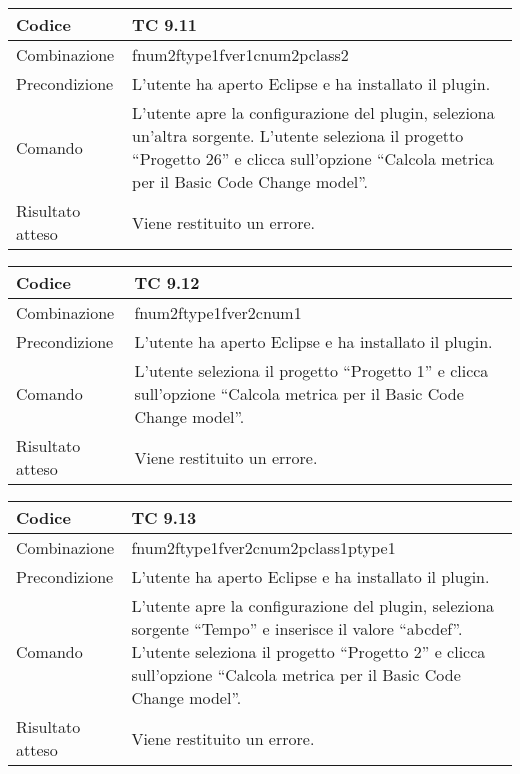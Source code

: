 \begin{table}[ht]
\begin{tabular}{|p{3cm}|p{9cm}|}
\hline
\cellcolor{lightgray}Codice				& TC 9.11								\\
\hline
\cellcolor{lightgray}Combinazione		& fnum2ftype1fver1cnum2pclass2									\\
\hline
\cellcolor{lightgray}Precondizione		& L'utente ha aperto Eclipse e ha installato il plugin.		\\
\hline
\cellcolor{lightgray}Comando			& L'utente apre la configurazione del plugin, seleziona un'altra sorgente. L'utente seleziona il progetto ``Progetto 26''  e clicca sull'opzione ``Calcola metrica per il Basic Code Change model''.	\\
\hline
\cellcolor{lightgray}Risultato atteso	& Viene restituito un errore.\\
\hline
\end{tabular}
\end{table}



\begin{table}[ht]
\begin{tabular}{|p{3cm}|p{9cm}|}
\hline
\cellcolor{lightgray}Codice				& TC 9.12								\\
\hline
\cellcolor{lightgray}Combinazione		& fnum2ftype1fver2cnum1									\\
\hline
\cellcolor{lightgray}Precondizione		& L'utente ha aperto Eclipse e ha installato il plugin.		\\
\hline
\cellcolor{lightgray}Comando			& L'utente seleziona il progetto ``Progetto 1''  e clicca sull'opzione ``Calcola metrica per il Basic Code Change model''.	\\
\hline
\cellcolor{lightgray}Risultato atteso	& Viene restituito un errore.\\
\hline
\end{tabular}
\end{table}

\clearpage

\begin{table}[ht]
\begin{tabular}{|p{3cm}|p{9cm}|}
\hline
\cellcolor{lightgray}Codice				& TC 9.13								\\
\hline
\cellcolor{lightgray}Combinazione		& fnum2ftype1fver2cnum2pclass1ptype1									\\
\hline
\cellcolor{lightgray}Precondizione		& L'utente ha aperto Eclipse e ha installato il plugin.		\\
\hline
\cellcolor{lightgray}Comando			& L'utente apre la configurazione del plugin, seleziona sorgente ``Tempo'' e inserisce il valore ``abcdef''. L'utente seleziona il progetto ``Progetto 2''  e clicca sull'opzione ``Calcola metrica per il Basic Code Change model''.	\\
\hline
\cellcolor{lightgray}Risultato atteso	& Viene restituito un errore.\\
\hline
\end{tabular}
\end{table}


